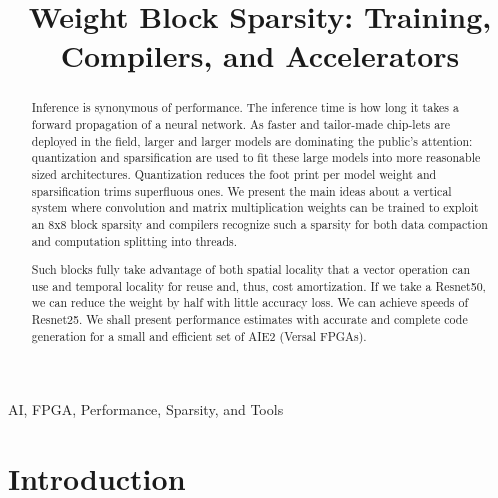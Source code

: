 \documentclass[conference]{IEEEtran}
\begin{document}
\title{Weight Block Sparsity: Training, Compilers, and Accelerators  }

\author{
  \and
  \and
  \and
  \and
  \and
  \and
  \and
}

\maketitle

\begin{abstract}
Inference is synonymous of performance. The inference time is how long
it takes a forward propagation of a neural network.  As faster and
tailor-made chip-lets are deployed in the field, larger and larger
models are dominating the public's attention: quantization and
sparsification are used to fit these large models into more reasonable
sized architectures. Quantization reduces the foot print per model
weight and sparsification trims superfluous ones.  We present the main
ideas about a vertical system where convolution and matrix
multiplication weights can be trained to exploit an 8x8 block sparsity
and compilers recognize such a sparsity for both data compaction and
computation splitting into threads.

Such blocks fully take advantage of both spatial locality that a
vector operation can use and temporal locality for reuse and, thus,
cost amortization. If we take a Resnet50, we can reduce the weight by
half with little accuracy loss. We can achieve speeds of Resnet25. We
shall present performance estimates with accurate and complete code
generation for a small and efficient set of AIE2 (Versal FPGAs).
\end{abstract}


\begin{IEEEkeywords}
 AI, FPGA, Performance, Sparsity, and Tools
\end{IEEEkeywords}

\section{Introduction}
\label{sec:introduction}
\end{document}
